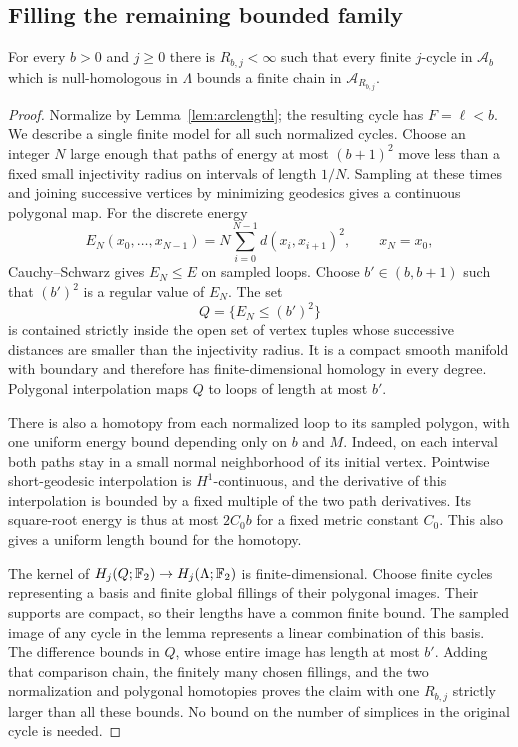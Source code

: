 \subsection{Filling the remaining bounded family}

\begin{lemma}\label{lem:shortening-bounded}
For every $b>0$ and $j\ge0$ there is $R_{b,j}<\infty$ such that every
finite $j$-cycle in $\mathcal A_b$ which is null-homologous in $\Lambda$
bounds a finite chain in $\mathcal A_{R_{b,j}}$.
\end{lemma}

\begin{proof}
Normalize by Lemma~\ref{lem:arclength}; the resulting cycle has
$F=\ell<b$.  We describe a single finite model for all such normalized
cycles.  Choose an integer $N$ large enough that paths of energy at most
$(b+1)^2$ move less than a fixed small injectivity radius on intervals
of length $1/N$.  Sampling at these times and joining successive
vertices by minimizing geodesics gives a continuous polygonal map.
For the discrete energy
\[
 E_N(x_0,\ldots,x_{N-1})
   =N\sum_{i=0}^{N-1}d(x_i,x_{i+1})^2,
 \qquad x_N=x_0,
\]
Cauchy--Schwarz gives $E_N\le E$ on sampled loops.
Choose $b'\in(b,b+1)$ such that $(b')^2$ is a regular value of $E_N$.
The set
\[
 Q=\{E_N\le(b')^2\}
\]
is contained strictly inside the open set of vertex tuples whose
successive distances are smaller than the injectivity radius.  It is a
compact smooth manifold with boundary and therefore has finite-dimensional
homology in every degree.  Polygonal interpolation maps $Q$ to loops
of length at most $b'$.

There is also a homotopy from each normalized loop to its sampled
polygon, with one uniform energy bound depending only on $b$ and $M$.
Indeed, on each interval both paths stay in a small normal neighborhood
of its initial vertex.  Pointwise short-geodesic interpolation is
$H^1$-continuous, and the derivative of this interpolation is bounded
by a fixed multiple of the two path derivatives.  Its square-root energy
is thus at most $2C_0b$ for a fixed metric constant $C_0$.  This also
gives a uniform length bound for the homotopy.

The kernel of $H_j(Q;\mathbb F_2)\to H_j(\Lambda;\mathbb F_2)$ is finite-dimensional.
Choose finite cycles representing a basis and finite global fillings of
their polygonal images.  Their supports are compact, so their lengths
have a common finite bound.  The sampled image of any cycle in the
lemma represents a linear combination of this basis.  The difference
bounds in $Q$, whose entire image has length at most $b'$.  Adding that
comparison chain, the finitely many chosen fillings, and the two
normalization and polygonal homotopies proves the claim with one
$R_{b,j}$ strictly larger than all these bounds.  No bound on the number
of simplices in the original cycle is needed.
\end{proof}


